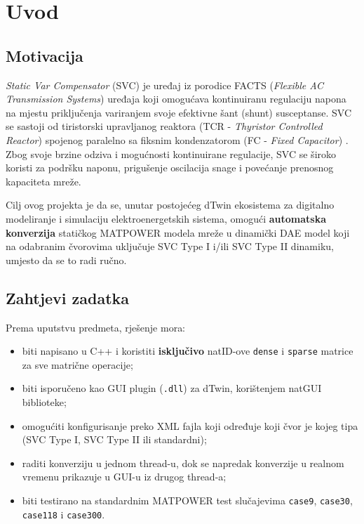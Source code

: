 \documentclass[11pt,a4paper]{report}
\begin{document}
\chapter{Uvod}

\section{Motivacija}

\emph{Static Var Compensator} (SVC) je uređaj iz porodice FACTS (\emph{Flexible AC
Transmission Systems}) uređaja koji omogućava kontinuiranu regulaciju napona na mjestu
priključenja variranjem svoje efektivne šant (shunt) susceptanse. SVC se sastoji od
tiristorski upravljanog reaktora (TCR - \emph{Thyristor Controlled Reactor}) spojenog
paralelno sa fiksnim kondenzatorom (FC - \emph{Fixed Capacitor})
\cite{acha2004facts,milano2010psms}. Zbog svoje brzine odziva i mogućnosti kontinuirane
regulacije, SVC se široko koristi za podršku naponu, prigušenje oscilacija snage i
povećanje prenosnog kapaciteta mreže.

Cilj ovog projekta je da se, unutar postojećeg dTwin ekosistema za digitalno modeliranje
i simulaciju elektroenergetskih sistema, omogući \textbf{automatska konverzija} statičkog
MATPOWER modela mreže u dinamički DAE model koji na odabranim čvorovima uključuje SVC
Type I i/ili SVC Type II dinamiku, umjesto da se to radi ručno.

\section{Zahtjevi zadatka}

Prema uputstvu predmeta, rješenje mora:
\begin{itemize}
    \item biti napisano u C++ i koristiti \textbf{isključivo} natID-ove \texttt{dense} i
        \texttt{sparse} matrice za sve matrične operacije;
    \item biti isporučeno kao GUI plugin (\texttt{.dll}) za dTwin, korištenjem natGUI
        biblioteke;
    \item omogućiti konfigurisanje preko XML fajla koji određuje koji čvor je kojeg tipa
        (SVC Type I, SVC Type II ili standardni);
    \item raditi konverziju u jednom thread-u, dok se napredak konverzije u realnom
        vremenu prikazuje u GUI-u iz drugog thread-a;
    \item biti testirano na standardnim MATPOWER test slučajevima \texttt{case9},
        \texttt{case30}, \texttt{case118} i \texttt{case300}.
\end{itemize}
\end{document}
